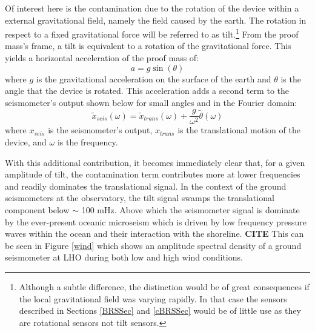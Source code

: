 \documentclass [12pt, proquest]{uwthesis}[2019]
\begin{document}
Of interest here is the contamination due to the rotation of the device within a external gravitational field, namely the field caused by the earth. The rotation in respect to a fixed gravitational force will be referred to as tilt.\footnote{Although a subtle difference, the distinction would be of great consequences if the local gravitational field was varying rapidly. In that case the sensors described in Sections \ref{BRSSec} and \ref{cBRSSec} would be of little use as they are rotational sensors not tilt sensors.} From the proof mass's frame, a tilt is equivalent to a rotation of the gravitational force. This yields a horizontal acceleration of the proof mass of:
\[ a=g \sin(\theta)\]
where $g$ is the gravitational acceleration on the surface of the earth and $\theta$ is the angle that the device is rotated. This acceleration adds a second term to the seismometer's output shown below for small angles and in the Fourier domain:
\[\tilde{x}_{seis}(\omega)=\tilde{x}_{trans}(\omega)+\frac{g}{\omega^2}\tilde{\theta}(\omega)\]
where $x_{seis}$ is the seismometer's output, $x_{trans}$ is the translational motion of the device, and $\omega$ is the frequency. 

With this additional contribution, it becomes immediately clear that, for a given amplitude of tilt, the contamination term contributes more at lower frequencies and readily dominates the translational signal. In the context of the ground seismometers at the observatory, the tilt signal swamps the translational component below $\sim$ 100 mHz. Above which the seismometer signal is dominate by the ever-present oceanic microseism which is driven by low frequency pressure waves within the ocean and their interaction with the shoreline. \textbf{CITE} This can be seen in Figure \ref{wind} which shows an amplitude spectral density of a ground seismometer at LHO during both low and high wind conditions.
\end{document}
